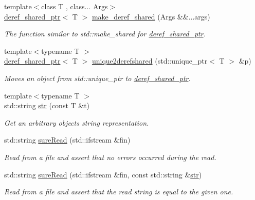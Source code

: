 \begin{DoxyCompactItemize}
{\footnotesize template$<$class T , class... Args$>$ }\\\hyperlink{classslb_1_1core_1_1util_1_1deref__shared__ptr}{deref\+\_\+shared\+\_\+ptr}$<$ T $>$ \hyperlink{namespaceslb_1_1core_1_1util_a1d307411caad59a01d41cbb34ea71d8c}{make\+\_\+deref\+\_\+shared} (Args \&\&...args)
\begin{DoxyCompactList}\small\item\em The function similar to {\ttfamily std\+::make\+\_\+shared} for \hyperlink{classslb_1_1core_1_1util_1_1deref__shared__ptr}{deref\+\_\+shared\+\_\+ptr}. \end{DoxyCompactList}\item 
{\footnotesize template$<$typename T $>$ }\\\hyperlink{classslb_1_1core_1_1util_1_1deref__shared__ptr}{deref\+\_\+shared\+\_\+ptr}$<$ T $>$ \hyperlink{namespaceslb_1_1core_1_1util_acb7cbe60d3098ca39a993fb6a5640a2f}{unique2derefshared} (std\+::unique\+\_\+ptr$<$ T $>$ \&p)
\begin{DoxyCompactList}\small\item\em Moves an object from {\ttfamily std\+::unique\+\_\+ptr} to \hyperlink{classslb_1_1core_1_1util_1_1deref__shared__ptr}{deref\+\_\+shared\+\_\+ptr}. \end{DoxyCompactList}\item 
{\footnotesize template$<$typename T $>$ }\\std\+::string \hyperlink{namespaceslb_1_1core_1_1util_a2e7207fe123391c539ef9924d347f7e1}{str} (const T \&t)
\begin{DoxyCompactList}\small\item\em Get an arbitrary object\textquotesingle{}s string representation. \end{DoxyCompactList}\item 
std\+::string \hyperlink{namespaceslb_1_1core_1_1util_a390411b2bdd9cdf930071614c6712579}{sure\+Read} (std\+::ifstream \&fin)
\begin{DoxyCompactList}\small\item\em Read from a file and assert that no errors occurred during the read. \end{DoxyCompactList}\item 
std\+::string \hyperlink{namespaceslb_1_1core_1_1util_ae3ed6a8de55ec15aa85f72911546e20d}{sure\+Read} (std\+::ifstream \&fin, const std\+::string \&\hyperlink{namespaceslb_1_1core_1_1util_a2e7207fe123391c539ef9924d347f7e1}{str})
\begin{DoxyCompactList}\small\item\em Read from a file and assert that the read string is equal to the given one. \end{DoxyCompactList}\item 

\end{DoxyCompactItemize}
